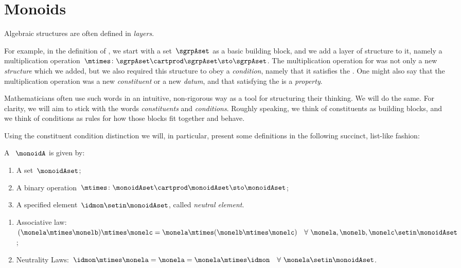 
\section{Monoids}
\label{sec:parallelism-monoids}

Algebraic structures are often defined in \emph{layers}.

For example, in the definition of  , we start with a set~$\sgrpAset$ as a basic building block, and we add a layer of structure to it, namely a multiplication operation~$\mtimes \colon \sgrpAset \cartprod \sgrpAset \sto \sgrpAset$.
The multiplication operation for  was not only a new \emph{structure} which we added, but we also required this structure to obey a \emph{condition}, namely that it satisfies the .
One might also say that the multiplication operation was a new \emph{constituent} or a new \emph{datum}, and that satisfying the  is a \emph{property}.

Mathematicians often use such words in an intuitive, non-rigorous way as a tool for structuring their thinking.
We will do the same.
For clarity, we will aim to stick with the words \emph{constituents} and \emph{conditions}.
Roughly speaking, we think of constituents as building blocks, and we think of conditions as rules for how those blocks fit together and behave.

Using the constituent \vs condition distinction we will, in particular, present some definitions in the following succinct, list-like fashion:

\begin{ctdefinition}[Monoid]
    \label{def:monoid}
    A ~$\monoidA$  is given by:
    \begin{body}
        \constit
        \begin{enumerate}
            \item A set~$\monoidAset$;
            \item A binary operation~$\mtimes  \colon \monoidAset \cartprod \monoidAset \sto \monoidAset$;
            \item A specified element~$\idmon \setin \monoidAset$, called \emph{neutral element}.
        \end{enumerate}
        \condit
        \begin{enumerate}
            \item Associative law:~$(\monela\mtimes  \monelb)\mtimes  \monelc=
                      \monela\mtimes  (\monelb\mtimes  \monelc) \quad  \forall \  \monela, \monelb, \monelc \setin \monoidAset$;
            \item Neutrality Laws:~$\idmon\mtimes \monela=\monela=\monela\mtimes  \idmon \quad  \forall \ \monela \setin \monoidAset $.
        \end{enumerate}
    \end{body}
\end{ctdefinition}

